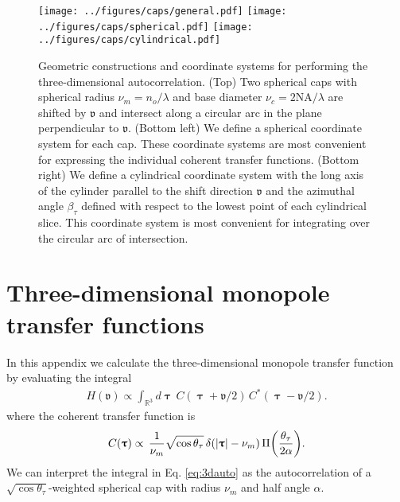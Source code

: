 \documentclass[]{osa-article}
\let\originalleft\left
\let\originalright\right
\renewcommand{\left}{\mathopen{}\mathclose\bgroup\originalleft}
\renewcommand{\right}{\aftergroup\egroup\originalright}
\providecommand{\mbb}[1]{\mathbb{#1}}
\providecommand{\bs}[1]{\boldsymbol{#1}}
\providecommand{\bv}{\boldsymbol{\mathfrak{v}}}
\providecommand{\bt}{\bs{\uptau}}
\begin{document}
\begin{figure}
  \centering
  \texttt{[image: ../figures/caps/general.pdf]}
  \texttt{[image: ../figures/caps/spherical.pdf]}\hspace{0.5em}
  \texttt{[image: ../figures/caps/cylindrical.pdf]}
  \caption{Geometric constructions and coordinate systems for performing the three-dimensional autocorrelation. (Top) Two spherical caps with spherical radius $\nu_m = n_o/\lambda$ and base diameter $\nu_c = 2\text{NA}/\lambda$ are shifted by $\bv$ and intersect along a circular arc in the plane perpendicular to $\bv$. (Bottom left) We define a spherical coordinate system for each cap. These coordinate systems  are most convenient for expressing the individual coherent transfer functions. (Bottom right) We define a cylindrical coordinate system with the long axis of the cylinder parallel to the shift direction $\bv$ and the azimuthal angle $\beta_\tau$ defined with respect to the lowest point of each cylindrical slice. This coordinate system is most convenient for integrating over the circular arc of intersection.}
  \label{fig:caps}
\end{figure}

\section{Three-dimensional monopole transfer functions}\label{sec:monoauto}
In this appendix we calculate the three-dimensional monopole transfer function
by evaluating the integral
\begin{align}
  H(\bv) \propto \int_{\mbb{R}^3}d\bt\, C(\bt + \bv/2)\,C^*(\bt - \bv/2). \label{eq:3dauto}
\end{align}
where the coherent transfer function is
\begin{align}
  C(\bt) \propto \,\frac{1}{\nu_m}\sqrt{\cos\theta_{\tau}}\,\delta\left(|\bt| - \nu_m\right)\,\Pi\left(\frac{\theta_{\tau}}{2\alpha}\right).\label{eq:3dctf2}
\end{align}
We can interpret the integral in Eq. \eqref{eq:3dauto} as the autocorrelation of a $\sqrt{\cos\theta_\tau}$-weighted spherical cap with radius $\nu_m$ and half angle $\alpha$.
\end{document}
